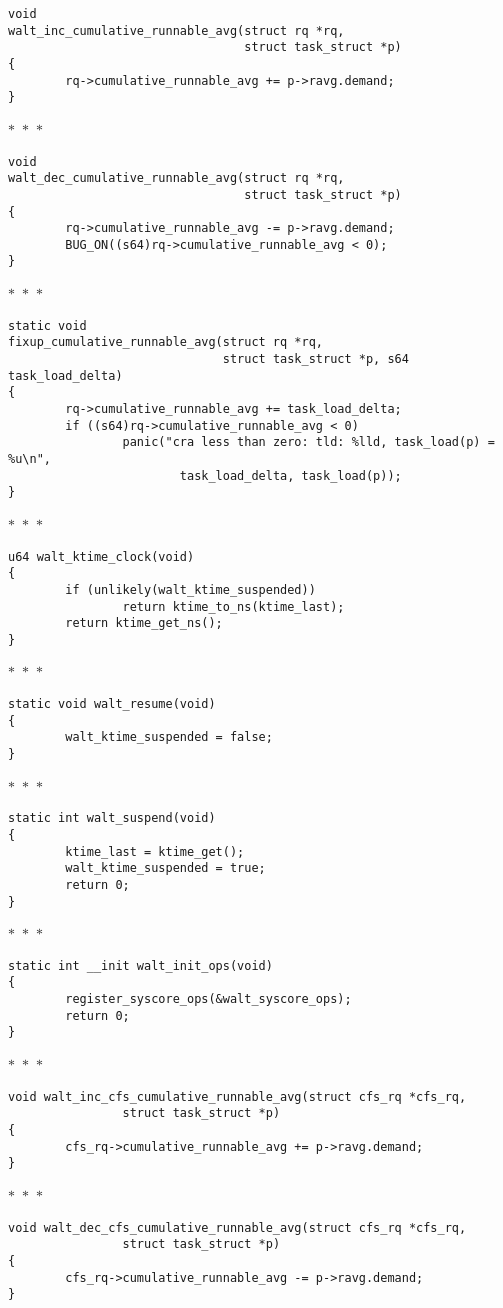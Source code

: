 \documentclass{article}
\newcommand{\divider}{{\begin{center}
  $\ast$~$\ast$~$\ast$
\end{center}}}
\begin{document}
\begin{verbatim}
void
walt_inc_cumulative_runnable_avg(struct rq *rq,
                                 struct task_struct *p)
{
        rq->cumulative_runnable_avg += p->ravg.demand;
}
\end{verbatim}
\divider
\begin{verbatim}
void
walt_dec_cumulative_runnable_avg(struct rq *rq,
                                 struct task_struct *p)
{
        rq->cumulative_runnable_avg -= p->ravg.demand;
        BUG_ON((s64)rq->cumulative_runnable_avg < 0);
}
\end{verbatim}
\divider
\begin{verbatim}
static void
fixup_cumulative_runnable_avg(struct rq *rq,
                              struct task_struct *p, s64 task_load_delta)
{
        rq->cumulative_runnable_avg += task_load_delta;
        if ((s64)rq->cumulative_runnable_avg < 0)
                panic("cra less than zero: tld: %lld, task_load(p) = %u\n",
                        task_load_delta, task_load(p));
}
\end{verbatim}
\divider
\begin{verbatim}
u64 walt_ktime_clock(void)
{
        if (unlikely(walt_ktime_suspended))
                return ktime_to_ns(ktime_last);
        return ktime_get_ns();
}
\end{verbatim}
\divider
\begin{verbatim}
static void walt_resume(void)
{
        walt_ktime_suspended = false;
}
\end{verbatim}
\divider
\begin{verbatim}
static int walt_suspend(void)
{
        ktime_last = ktime_get();
        walt_ktime_suspended = true;
        return 0;
}
\end{verbatim}
\divider
\begin{verbatim}
static int __init walt_init_ops(void)
{
        register_syscore_ops(&walt_syscore_ops);
        return 0;
}
\end{verbatim}
\divider
\begin{verbatim}
void walt_inc_cfs_cumulative_runnable_avg(struct cfs_rq *cfs_rq,
                struct task_struct *p)
{
        cfs_rq->cumulative_runnable_avg += p->ravg.demand;
}
\end{verbatim}
\divider
\begin{verbatim}
void walt_dec_cfs_cumulative_runnable_avg(struct cfs_rq *cfs_rq,
                struct task_struct *p)
{
        cfs_rq->cumulative_runnable_avg -= p->ravg.demand;
}
\end{verbatim}
\end{document}
